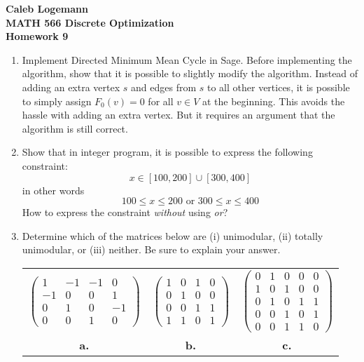 \documentclass[11pt, oneside]{article}
\begin{document}
\noindent \textbf{\Large{Caleb Logemann \\
MATH 566 Discrete Optimization\\
Homework 9
}}

%
\begin{enumerate}
  \item %
    Implement Directed Minimum Mean Cycle in Sage. 
    Before implementing the algorithm, show that it is possible to slightly
    modify the algorithm.
    Instead of adding an extra vertex $s$ and edges from $s$ to all other
    vertices, it is possible to simply assign $F_0(v) = 0$ for all $v \in V$ at
    the beginning.
    This avoids the hassle with adding an extra vertex.
    But it requires an argument that the algorithm is still correct.

  \item %
    Show that in integer program, it is possible to express the following constraint:
    \[
      x \in [100,200]  \cup [300,400]
    \]
    in other words
    \[
      100 \leq x \leq 200   \text{ or } 300 \leq x \leq 400
    \]
    How to express the constraint \emph{without} using \emph{or}?\\

  \item %
    Determine which of the matrices below are (i) unimodular, (ii) totally
    unimodular, or (iii) neither.
    Be sure to explain your answer.

    \begin{center}
      \begin{tabular}[h]{c@{\qquad}c@{\qquad}c}
        $\left(\begin{array}{rrrr}
        1 & -1 & -1 & 0\\
        -1 & 0 & 0 & 1\\
        0 & 1 & 0 & -1\\
        0 & 0 & 1 & 0\end{array}\right)$ & 
        $\left(\begin{array}{cccc}
        1 & 0 & 1 & 0\\
        0 & 1 & 0 & 0\\
        0 & 0 & 1 & 1\\
        1 & 1 & 0 & 1\end{array}\right)$ &
        $\left(\begin{array}{ccccc}
        0 & 1 & 0 & 0 & 0  \\
        1 & 0 & 1 & 0  & 0 \\
        0 & 1 & 0 & 1 & 1\\
        0 & 0 & 1 & 0 & 1\\
        0 & 0 & 1 & 1 & 0\end{array}\right) $
        \\
        \textbf{a.} &
        \textbf{b.}  &
        \textbf{c.} 
      \end{tabular}
    \end{center}


\end{enumerate}
\end{document}
